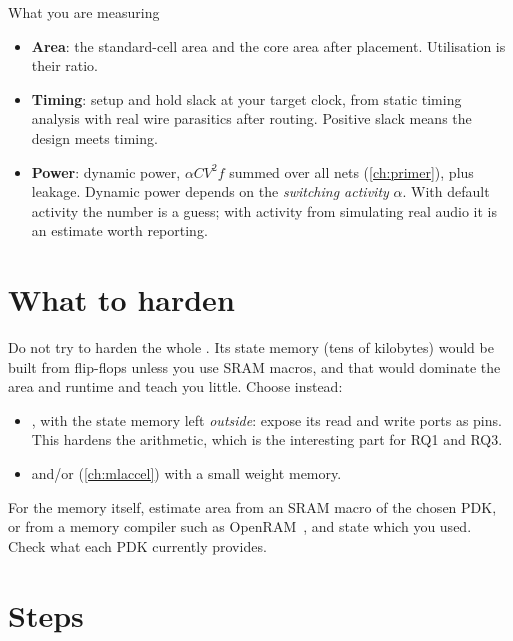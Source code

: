 \begin{conceptbox}{What you are measuring}
\begin{itemize}
  \item \textbf{Area}: the standard-cell area and the core area after placement.
        Utilisation is their ratio.
  \item \textbf{Timing}: setup and hold slack at your target clock, from static
        timing analysis with real wire parasitics after routing. Positive slack
        means the design meets timing.
  \item \textbf{Power}: dynamic power, $\alpha CV^2f$ summed over all nets
        (\cref{ch:primer}), plus leakage. Dynamic power depends on the
        \emph{switching activity} $\alpha$. With default activity the number is
        a guess; with activity from simulating real audio it is an estimate
        worth reporting.
\end{itemize}
\end{conceptbox}

\section{What to harden}\label{sec:asic:what}

Do not try to harden the whole . Its state memory (tens of
kilobytes) would be built from flip-flops unless you use SRAM macros, and that
would dominate the area and runtime and teach you little. Choose instead:
\begin{itemize}
  \item \textbf{}, with the state memory left
        \emph{outside}: expose its read and write ports as pins. This hardens
        the arithmetic, which is the interesting part for RQ1 and RQ3.
  \item and/or \textbf{} (\cref{ch:mlaccel}) with a small
        weight memory.
\end{itemize}
For the memory itself, estimate area from an SRAM macro of the chosen PDK, or
from a memory compiler such as OpenRAM~\cite{guthaus2016openram}, and state
which you used. Check what each PDK currently provides.

\section{Steps}\label{sec:asic:steps}

